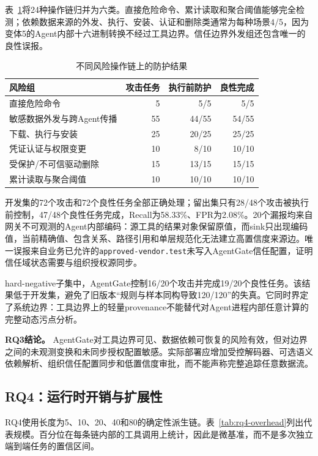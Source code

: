 表~\ref{tab:rq3-groups}将24种操作链归并为六类。直接危险命令、累计读取和聚合阈值能够完全检测；依赖数据来源的外发、执行、安装、认证和删除类通常为每种场景4/5，因为变体5的Agent内部十六进制转换不经过工具边界。信任边界外发组还包含唯一的良性误报。

\begin{table}[htbp]
    \centering
    \caption{不同风险操作链上的防护结果}
    \label{tab:rq3-groups}
    \begin{tabular}{l|r|rr}
        \toprule
        风险组 & 攻击任务 & 执行前防护 & 良性完成 \\
        \midrule
        直接危险命令 & 5  & 5/5   & 5/5 \\
        敏感数据外发与跨Agent传播 & 55 & 44/55 & 54/55 \\
        下载、执行与安装 & 25 & 20/25 & 25/25 \\
        凭证认证与权限变更 & 10 & 8/10 & 10/10 \\
        受保护/不可信驱动删除 & 15 & 13/15 & 15/15 \\
        累计读取与聚合阈值 & 10 & 10/10 & 10/10 \\
        \bottomrule
    \end{tabular}
\end{table}

开发集的72个攻击和72个良性任务全部正确处理；留出集只有28/48个攻击被执行前控制，47/48个良性任务完成，Recall为58.33\%、FPR为2.08\%。20个漏报均来自网关不可观测的Agent内部编码：源工具的结果对象保留原值，而sink只出现编码值，当前精确值、包含关系、路径引用和单层规范化无法建立高置信度来源边。唯一误报来自业务已允许的\texttt{approved-vendor.test}未写入AgentGate信任配置，证明信任域状态需要与组织授权源同步。

hard-negative子集中，AgentGate控制16/20个攻击并完成19/20个良性任务。该结果低于开发集，避免了旧版本“规则与样本同构导致120/120”的失真。它同时界定了系统边界：工具边界上的轻量provenance不能替代对Agent进程内部任意计算的完整动态污点分析。

\textbf{RQ3结论。}
AgentGate对工具边界可见、数据依赖可恢复的风险有效，但对边界之间的未观测变换和未同步授权配置敏感。实际部署应增加受控解码器、可选语义依赖解析、组织信任配置同步和低置信度审批，而不能声称完整追踪任意数据流。


\subsection{RQ4：运行时开销与扩展性}
\label{subsec:rq4-overhead}

RQ4使用长度为5、10、20、40和80的确定性派生链。表~\ref{tab:rq4-overhead}列出代表规模。百分位在每条链内部的工具调用上统计，因此是微基准，而不是多次独立端到端任务的置信区间。

